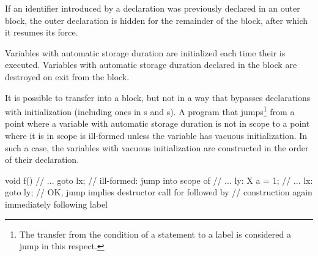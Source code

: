 If an identifier introduced by a declaration was previously declared in
an outer block,
%
%
%
the outer declaration is hidden for the remainder of the block, after
which it resumes its force.

\pnum
{}%
%
Variables with automatic storage duration are
initialized each time their  is executed.
%
Variables with automatic storage duration declared in the block are
destroyed on exit from the block.

\pnum
{}%
%
It is possible to transfer into a block, but not in a way that bypasses
declarations with initialization (including ones in s
and s).
A program that jumps\footnote{The transfer from the condition of a  statement to a
 label is considered a jump in this respect.}
from a point where a variable with automatic storage duration is
not in scope to a point where it is in scope is ill-formed unless
the variable has vacuous initialization.
In such a case, the variables with vacuous initialization
are constructed in the order of their declaration.
\begin{example}
\begin{codeblock}
void f() {
  // ...
  goto lx;          // ill-formed: jump into scope of 
  // ...
ly:
  X a = 1;
  // ...
lx:
  goto ly;          // OK, jump implies destructor call for  followed by
                    // construction again immediately following label 
}
\end{codeblock}
\end{example}

